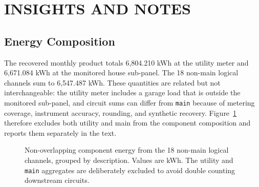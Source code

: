 \documentclass{IEEEoj-data}
\begin{document}
\section*{INSIGHTS AND NOTES}

\subsection{Energy Composition}
The recovered monthly product totals 6,804.210 kWh at the utility meter and 6,671.084 kWh at the monitored house sub-panel. The 18 non-main logical channels sum to 6,547.487 kWh. These quantities are related but not interchangeable: the utility meter includes a garage load that is outside the monitored sub-panel, and circuit sums can differ from \texttt{main} because of metering coverage, instrument accuracy, rounding, and synthetic recovery. Figure~\ref{fig:energy} therefore excludes both utility and main from the component composition and reports them separately in the text.

\begin{figure}[!t]
\centering
{}
\caption{Non-overlapping component energy from the 18 non-main logical channels, grouped by description. Values are kWh. The utility and \texttt{main} aggregates are deliberately excluded to avoid double counting downstream circuits.}
\label{fig:energy}
\end{figure}
\end{document}
